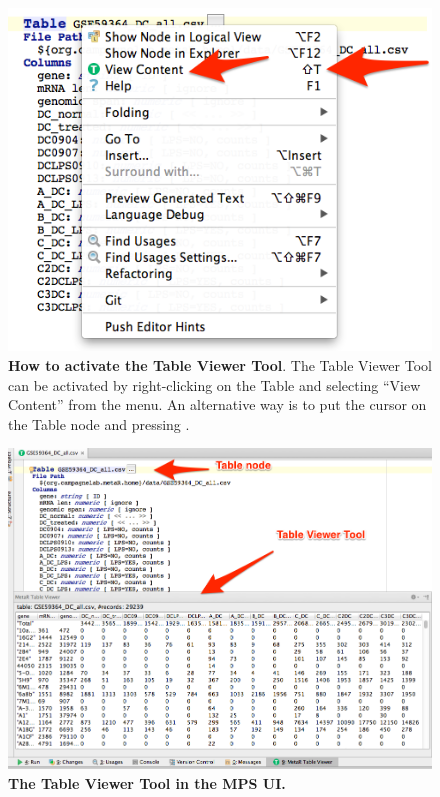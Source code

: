 \begin{figure}
  \centering
  \includegraphics[width=\figWidthNarrow]{figures/ActivateTableViewer.png}
\caption[How to activate the Table Viewer Tool]{\textbf{How to activate the Table Viewer Tool}. The Table Viewer Tool can be activated by right-clicking on the Table and selecting ``View Content'' from the menu. An alternative way is to put the cursor on the Table node and pressing .}
\label{fig:ActivateTableViewer}
\end{figure}  

\begin{figure}[h!tbp]
  \centering
  \includegraphics[width=\figWidthWide]{figures/TableViewerInMPS.png}
\caption[The Table Viewer Tool in the MPS UI]{\textbf{The Table Viewer Tool in the MPS UI.} }
\label{fig:TableViewerInMPS}
\end{figure}

